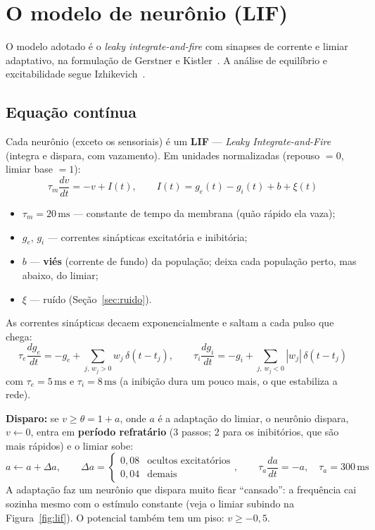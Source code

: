 \documentclass[11pt,a4paper]{article}
\newcommand{\ms}{\,\mathrm{ms}}
\begin{document}
\section{O modelo de neurônio (LIF)}\label{sec:lif}

O modelo adotado é o \emph{leaky integrate-and-fire} com sinapses de corrente e limiar adaptativo, na formulação de Gerstner e
Kistler~\cite{gerstner2002}. A análise de equilíbrio e excitabilidade segue Izhikevich~\cite{izhikevich2007}.

\subsection{Equação contínua}

Cada neurônio (exceto os sensoriais) é um \textbf{LIF} — \emph{Leaky Integrate-and-Fire} (integra e dispara, com vazamento). Em unidades
normalizadas (repouso $=0$, limiar base $=1$):
\begin{equation}
\tau_m \frac{dv}{dt} = -v + I(t), \qquad I(t) = g_e(t) - g_i(t) + b + \xi(t)
\label{eq:lif}
\end{equation}
\begin{itemize}
  \item $\tau_m = 20\ms$ — constante de tempo da membrana (quão rápido ela vaza);
  \item $g_e$, $g_i$ — correntes sinápticas excitatória e inibitória;
  \item $b$ — \textbf{viés} (corrente de fundo) da população; deixa cada população perto, mas abaixo, do limiar;
  \item $\xi$ — ruído (Seção~\ref{sec:ruido}).
\end{itemize}

As correntes sinápticas decaem exponencialmente e saltam a cada pulso que chega:
\begin{equation}
\tau_e \frac{dg_e}{dt} = -g_e + \sum_{j,\,w_j>0} w_j\, \delta(t-t_j), \qquad
\tau_i \frac{dg_i}{dt} = -g_i + \sum_{j,\,w_j<0} |w_j|\, \delta(t-t_j)
\end{equation}
com $\tau_e = 5\ms$ e $\tau_i = 8\ms$ (a inibição dura um pouco mais, o que estabiliza a rede).

\textbf{Disparo:} se $v \ge \theta = 1 + a$, onde $a$ é a adaptação do limiar, o neurônio dispara, $v \leftarrow 0$, entra em
\textbf{período refratário} (3 passos; 2 para os inibitórios, que são mais rápidos) e o limiar sobe:
\begin{equation}
a \leftarrow a + \Delta a, \qquad \Delta a = \begin{cases} 0{,}08 & \text{ocultos excitatórios} \\ 0{,}04 & \text{demais} \end{cases},
\qquad \tau_a \frac{da}{dt} = -a,\quad \tau_a = 300\ms
\end{equation}
A adaptação faz um neurônio que dispara muito ficar “cansado”: a frequência cai sozinha mesmo com o estímulo constante (veja o limiar
subindo na Figura~\ref{fig:lif}). O potencial também tem um piso: $v \ge -0{,}5$.
\end{document}
